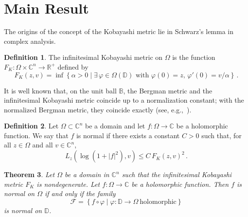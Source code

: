 \documentclass[pdflatex]{sn-jnl}%
\newtheorem{thm}{Theorem}[section]
\theoremstyle{definition}
\newtheorem{defn}[thm]{Definition}
\theoremstyle{remark}
\numberwithin{equation}{section}
\newcommand{\set}[1]{\left\{#1\right\}}
\newcommand{\C}{\mathbb{C}}
\newcommand{\D}{\mathbb{D}}
\begin{document}
    \section{Main Result}

    The origins of the concept of the Kobayashi metric lie in Schwarz's lemma in complex analysis.

    \begin{defn}
        The infinitesimal Kobayashi metric on $\Omega$ is the function $F_K:\Omega\times\C^n\to\mathbb{R}^{+}$ defined by
        \[
            F_K(z,v) = \inf\set{ \alpha>0 \mid \exists\,\varphi\in\Omega(\D) \text{ with } \varphi(0)=z,\, \varphi'(0)=v/\alpha }\,.
        \]
    \end{defn}

    It is well known that, on the unit ball $\mathbb{B}$, the Bergman metric and the infinitesimal Kobayashi metric coincide up to a normalization constant; with the normalized Bergman metric, they coincide exactly (see, e.g.,~\cite{MR1098711,MR2446682}).

    \begin{defn}
        \label{defn-norm-function}
        Let $\Omega\subset\C^n$ be a domain and let $f:\Omega\to\C$ be a holomorphic function.
        We say that $f$ is normal if there exists a constant $C>0$ such that, for all $z\in\Omega$ and all $v\in\C^n$,
        \[
            L_z\left(\log(1+|f|^2),v\right) \leq C\,F_K(z,v)^2\,.
        \]
    \end{defn}

    \begin{thm}
        Let $\Omega$ be a domain in $\C^n$ such that the infinitesimal Kobayashi metric $F_K$ is nondegenerate.
        Let $f:\Omega\to\C$ be a holomorphic function.
        Then $f$ is normal on $\Omega$ if and only if the family
        \[
            \mathcal{F}= \set{f\circ\varphi \mid \varphi:\D\to\Omega\ \text{holomorphic}}
        \]
        is normal on $\D$.
    \end{thm}
\end{document}
